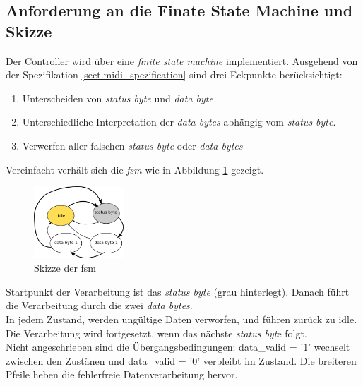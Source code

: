 \subsection{Anforderung an die Finate State Machine und Skizze}\label{anforderung_fsm}
Der Controller wird über eine \textit{finite state machine} implementiert. Ausgehend von der Spezifikation \ref{sect.midi_spezification} sind drei Eckpunkte berücksichtigt:
\begin{enumerate}
	\item Unterscheiden von \textit{status byte} und \textit{data byte}
	\item Unterschiedliche Interpretation der \textit{data bytes} abhängig vom \textit{status byte}.
	\item Verwerfen aller falschen \textit{status byte} oder \textit{data bytes}
\end{enumerate}
\smallskip
Vereinfacht verhält sich die \textit{fsm} wie in Abbildung \ref{fig.midi_fsm_skizze} gezeigt. 
\begin{figure}[H]
	\centering
	\includegraphics[width=0.3\textwidth]{images/midi_control/fsm_grob_2.png}
	\caption{Skizze der fsm}
	\label{fig.midi_fsm_skizze}
\end{figure}

Startpunkt der Verarbeitung ist das \textit{status byte} (grau hinterlegt). Danach führt die Verarbeitung durch die zwei \textit{data bytes}. \\
In jedem Zustand, werden ungültige Daten verworfen, und führen zurück zu idle. Die Verarbeitung wird fortgesetzt, wenn das nächste \textit{status byt}e folgt.\\
\newline
Nicht angeschrieben sind die Übergangsbedingungen: data\_valid = '1' wechselt zwischen den Zustänen und data\_valid = '0' verbleibt im Zustand. Die breiteren Pfeile heben die fehlerfreie Datenverarbeitung hervor.\\

